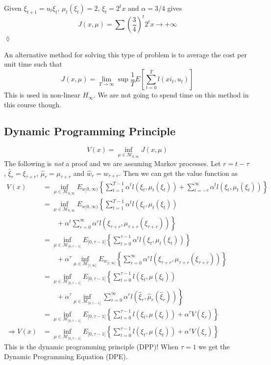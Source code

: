\begin{example}
Given $\xi_{t+1}=u_t\xi_t$, $\mu_t(\xi_t)=2$, $\xi_t=2^tx$ and $\alpha=3/4$ gives
$$J(x,\mu) = \sum\left(\frac{3}{4}\right)^t2^tx\to+\infty$$
$\lozenge$
\end{example}

An alternative method for solving this type of problem is to average the cost per unit time such that
$$J(x,\mu) = \lim_{T\to\infty}\sup \frac{1}{T}E\left[\sum_{t=0}^Tl(xi_t,u_t)\right]$$
This is used in non-linear $H_\infty$. We are not going to spend time on this method in this course though.

\subsection{Dynamic Programming Principle}
$$V(x) = \inf_{\mu\in\mathcal{M}_{0,\infty}} J(x,\mu)$$
The following is \textit{not} a proof and we are assuming Markov processes. Let $r=t-\tau$, $\hat{\xi}_r=\xi_{\tau+r}$, $\hat{\mu}_r=\mu_{\tau+r}$ and $\hat{w}_r=w_{\tau+r}$. Then we can get the value function as
\begin{align}
V(x) &= \inf_{\mu\in\mathcal{M}_{0,\infty}} E_{w_]0,\infty)} \left\lbrace \sum_{t=1}^{T-1} \alpha^tl(\xi_t,\mu_t(\xi_t)) + \sum_{t=-\tau}^\infty \alpha^tl(\xi_t,\mu_t(\xi_t))\right\rbrace \nonumber \\
&= \inf_{\mu\in\mathcal{M}_{0,\infty}} E_{w_]0,\infty)} \left\lbrace \sum_{t=1}^{T-1} \alpha^tl(\xi_t,\mu_t(\xi_t)) \right. \\
&\left. \qquad +  \alpha^t \sum_{r=0}^\infty \alpha^rl(\xi_{\tau+r},\mu_{\tau+r}(\xi_{\tau+r})) \right\rbrace \nonumber \\
&= \inf_{\mu\in\mathcal{M}_{]0,\tau-1[}} E_{]0,\tau-1[} \left\lbrace \sum_{t=0}^{\tau-1} \alpha^tl(\xi_t,\mu_t(\xi_t))\right\rbrace \nonumber \\
&\qquad + \alpha^\tau\inf_{\mu\in\mathcal{M}_{]\tau,\infty[}} E_{w_{]\tau,\infty[}} \left\lbrace \sum_{r=0}^\infty\alpha^rl(\xi_{\tau+r},\mu_{\tau+r}(\xi_{\tau+r}))\right\rbrace \nonumber \\
&= \inf_{\mu\in\mathcal{M}_{]0,\tau-1[}} E_{]0,\tau-1[} \left\lbrace \sum_{t=0}^{\tau-1} l(\xi_t,\mu(\xi_t)) \right. \\
&\left. \qquad + \alpha^\tau \inf_{\mu\in\mathcal{M}_{]0,\tau-1[}} \sum_{r=0}^\infty \alpha^rl(\hat{\xi}_r,\hat{\mu}_r(\hat{\xi}_r)) \right\rbrace \nonumber \\
&= \inf_{\mu\in\mathcal{M}_{]0,\tau-1[}} E_{]0,\tau-1[} \left\lbrace \sum_{t=0}^{\tau-1} l(\xi_t,\mu(\xi_t)) + \alpha^\tau V(\xi_\tau) \right\rbrace \nonumber \\
\Rightarrow V(x) &= \inf_{\mu\in\mathcal{M}_{]0,\tau-1[}} E_{]0,\tau-1[} \left\lbrace \sum_{t=0}^{\tau-1} l(\xi_t,\mu(\xi_t)) + \alpha^\tau V(\xi_\tau) \right\rbrace
\end{align}
This is the dynamic programming principle (DPP)! When $\tau=1$ we get the Dynamic Programming Equation (DPE).

